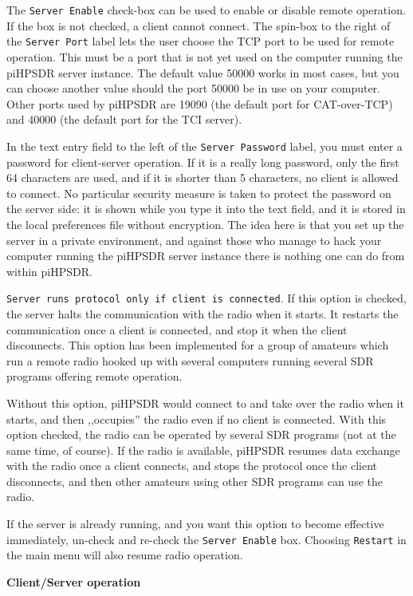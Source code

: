 \documentclass[12pt]{book}
\def\rett#1{\texttt{\color{red}#1}}
\def\pH{pi\-HPSDR\xspace}
\begin{document}
The \rett{Server Enable} check-box can be used to enable or disable remote operation. If the box is not
checked, a client cannot connect. The  spin-box  to the right of the \rett{Server Port} label lets the user
choose the TCP port to be  used for remote operation. This must be a port that is not yet used on the
computer running the \pH server instance. The default value 50000 works in most cases, but you can choose
another value should the port 50000 be in use on your computer. Other ports used by \pH are 19090 (the default
port for CAT-over-TCP) and 40000 (the default port for the TCI server).

In the text entry field to the left of   the \rett{Server Password} label, you must enter a password for
client-server operation. If it is a really long password, only the first 64 characters are used, and if it
is shorter than 5 characters, no client is allowed to connect. No particular security measure is taken
to protect the password on the server side: it is  shown while you type it into the  text field, and it is
stored in the local preferences file without encryption. The idea here is that you set up the server
in a private environment, and against those who manage to hack your computer running the \pH server instance
there is nothing one can do from within \pH.

\rett{Server runs protocol only if client is connected}.
 If this option is checked, the server halts
the communication with the radio when it starts. It restarts the communication once a client is connected,
and stop it when the client disconnects. This option has been implemented for a group of amateurs which
run a remote radio hooked up with several computers running several SDR programs offering remote operation.

Without this option, \pH would connect to and take over the radio when it starts, and then ,,occupies''
the radio even if no client is connected. With this option checked, the radio can be operated by
several SDR programs (not at the same time, of course). If the radio is available, \pH resumes
data exchange with the radio once a client connects, and stops the protocol once the client disconnects,
and then other amateurs using other SDR programs can use the radio.

If the server is already running, and you want this option to become effective immediately,
un-check and re-check the \rett{Server Enable} box. Choosing \rett{Restart} in the main menu
will also resume radio operation.

\textbf{Client/Server operation}
\end{document}

